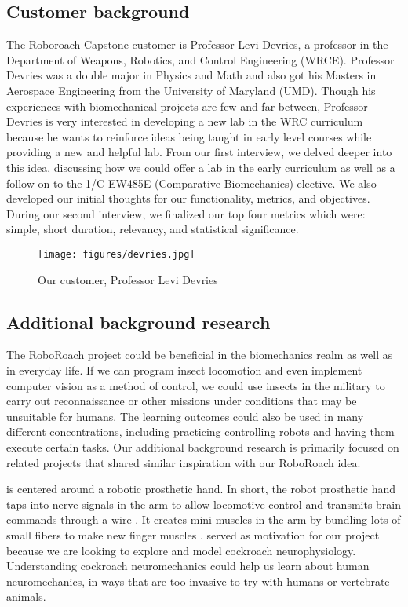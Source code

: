 \documentclass[twocolumn,10pt]{IEEEtran}
\begin{document}
\subsection{Customer background}
The Roboroach Capstone customer is Professor Levi Devries, a professor in the Department of Weapons, Robotics, and Control Engineering (WRCE). Professor Devries was a double major in Physics and Math and also got his Masters in Aerospace Engineering from the University of Maryland (UMD). Though his experiences with biomechanical projects are few and far between, Professor Devries is very interested in developing a new lab in the WRC curriculum because he wants to reinforce ideas being taught in early level courses while providing a new and helpful lab. From our first interview, we delved deeper into this idea, discussing how we could offer a lab in the early curriculum as well as a follow on to the 1/C EW485E (Comparative Biomechanics) elective. We also developed our initial thoughts for our functionality, metrics, and objectives. During our second interview, we finalized our top four metrics which were: simple, short duration, relevancy, and statistical significance. 
\begin{figure}
\begin{center}
\texttt{[image: figures/devries.jpg]}
\end{center}
\caption{Our customer, Professor Levi Devries}
\label{fig:profdevries}
\end{figure}

\subsection{Additional background research}
The RoboRoach project could be beneficial in the biomechanics realm as well as in everyday life. If we can program insect locomotion and even implement computer vision as a method of control, we could use insects in the military to carry out reconnaissance or other missions under conditions that may be unsuitable for humans. The learning outcomes could also be used in many different concentrations, including practicing controlling robots and having them execute certain tasks. Our additional background research is primarily focused on related projects that shared similar inspiration with our RoboRoach idea. 



\cite{servick2020minimuscles} is centered around a robotic prosthetic hand. In short, the robot prosthetic hand taps into nerve signals in the arm to allow locomotive control and transmits brain commands through a wire \cite{servick2020minimuscles}. It creates mini muscles in the arm by bundling lots of small fibers to make new finger muscles \cite{servick2020minimuscles}. \cite{servick2020minimuscles} served as motivation for our project because we are looking to explore and model cockroach neurophysiology. Understanding cockroach neuromechanics could help us learn about human neuromechanics, in ways that are too invasive to try with humans or vertebrate animals. 
\end{document}
